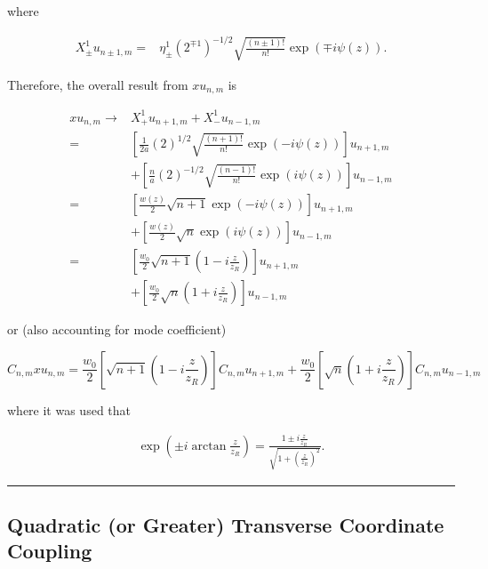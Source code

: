 \documentclass[aps,twoside,secnumarabic,balancelastpage,amsmath,amssymb,nofootinbib,hyperref=pdftex]{revtex4}
\begin{document}
where

\begin{align*}
	X_{\pm }^1 u_{n \pm 1, m} = &
		\eta_{\pm}^1	
		(2^{\mp 1} )^{-1/2}
		\sqrt{\frac{(n \pm 1)!}{n!} }
		\exp(\mp i  \psi(z)).
\end{align*}




Therefore, the overall result from $x u_{n,m}$ is

\begin{align*}
	x u_{n, m} \rightarrow &
		X_+^1 u_{n+1,m} + X_-^1 u_{n-1,m}
		\\=&
	\left[
		\frac{1}{2a}
				(2 )^{1/2}
		\sqrt{\frac{ (n+1)!}{ n!} }
		\exp(-i  \psi(z))
		\right]
		u_{n+1,m}		
		\\ & + 
		\left[
		\frac{n}{a}
				(2 )^{-1/2}
		\sqrt{\frac{ (n-1) !}{n!} }
		\exp( i \psi(z))
		\right]
		u_{n-1,m}
		\\ = &
	\left[
		\frac{w(z)}{2}
		\sqrt{n+1 }
		\exp(-i  \psi(z))
	\right]
		u_{n+1,m}		
		\\  & +
		\left[
		\frac{w(z)}{ 2}
		 \sqrt{n} 
		\exp( i \psi(z))
		\right]
		u_{n-1,m} 
		\\= & 
			\left[
		\frac{w_0}{2}
		\sqrt{n+1 }
		(1-i\frac{z}{z_R} )
	\right]
		u_{n+1,m}		
		\\& + 
		\left[
		\frac{w_0}{ 2}
		 \sqrt{n} 
		(1+i\frac{z}{z_R} )
		\right]
		u_{n-1,m}
\end{align*}

or (also accounting for mode coefficient)

\begin{equation}
C_{n,m} x u_{n,m}
=
\frac{w_0}{2}
			\left[
		\sqrt{n+1 }
		(1-i\frac{z}{z_R} )
	\right]
	C_{n,m}
		u_{n+1,m}		
		+
		\frac{w_0}{2}
		\left[
		 \sqrt{n} 
		(1+i\frac{z}{z_R} )
		\right]
		C_{n,m}
		u_{n-1,m}
\end{equation}

where it was used that

\begin{align*}
	\exp(\pm i \arctan\frac{z}{z_R})
		=\frac{1\pm i\frac{z}{z_R}}{\sqrt{1+(\frac{z}{z_R})^2}}		.			
\end{align*}


\rule{\textwidth}{0.4pt}

\clearpage

\subsection{Quadratic (or Greater) Transverse Coordinate Coupling}
\end{document}
